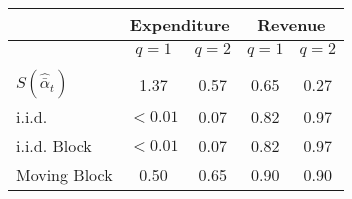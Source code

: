 \begin{tabular}{@{}lcccc@{}}
	\toprule 
	& \multicolumn{2}{c}{ Expenditure } & \multicolumn{2}{c}{ Revenue } \\
	\hline
	& $q=1$ & $q=2$ & $q=1$ & $q=2$ \\
	\hline \\
	$S (\hat{\bar{\alpha}}_{t})$ & 1.37 & 0.57 & 0.65 & 0.27\vspace{2mm}\\
	i.i.d. & $<0.01$ & 0.07 & 0.82 & 0.97\\
	i.i.d. Block & $<0.01$ & 0.07 & 0.82 & 0.97\\
	Moving Block & 0.50 & 0.65 & 0.90 & 0.90 \\
	\bottomrule
\end{tabular}

